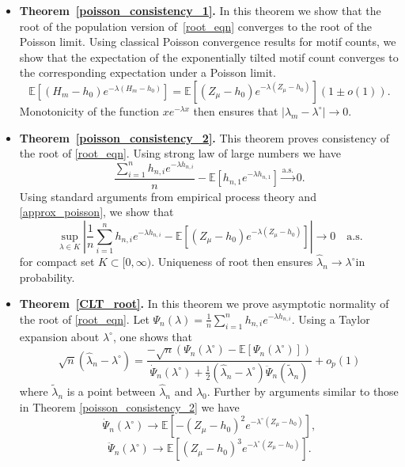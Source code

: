 \documentclass[12pt]{article}
\numberwithin{equation}{section}
\begin{document}
\begin{itemize}
    \item \textbf{Theorem~\ref{poisson_consistency_1}.} In this theorem we show that the root of the population version of~\eqref{root_eqn} converges to the root of the Poisson limit. Using classical Poisson convergence results for
    motif counts, we show that the expectation of the exponentially tilted motif count converges to
    the corresponding expectation under a Poisson limit. 
    \begin{equation}\mathbb{E}[(H_m-h_0)e^{-\lambda(H_m-h_0)}]=\mathbb{E}[(Z_{\mu}-h_0)e^{-\lambda(Z_{\mu}-h_0)}](1\pm o(1))\label{approx_poisson}.
\end{equation}
    Monotonicity of the function $xe^{-\lambda x}$ then ensures that $|\lambda_{m}-\lambda^{\circ}|\rightarrow 0$.\\
    
    \item \textbf{Theorem~\ref{poisson_consistency_2}.}
    This theorem proves consistency of the root of \eqref{root_eqn}. Using strong law of large numbers we have
    \[
\frac{\sum_{i=1}^n h_{n,i} e^{-\lambda h_{n,i}}}{n} - \mathbb{E}\left[h_{n,1} e^{-\lambda h_{n,1}}\right] \xrightarrow{\text{a.s.}} 0.
\]
Using standard arguments from empirical process theory and \eqref{approx_poisson}, we show that
\[
\sup_{\lambda \in K} \left\lvert\frac{1}{n} \sum_{i=1}^n h_{n,i} e^{-\lambda h_{n,i}} - \mathbb{E}\left[(Z_{\mu}-h_0)e^{-\lambda(Z_{\mu}-h_0)}\right]\right\rvert\to 0 \quad \text{a.s.}
\]
for compact set $K \subset [0, \infty)$. Uniqueness of root then ensures 
\(
 \hat{\lambda}_n \to \lambda^{\circ}\)in probability.\\
    
    \item \textbf{Theorem~\ref{CLT_root}.} In this theorem we prove asymptotic normality of the root of \eqref{root_eqn}. Let $\Psi_n(\lambda) = \frac{1}{n}\sum_{i=1}^n h_{n,i} e^{-\lambda h_{n,i}}$. Using a Taylor expansion about \(\lambda^{\circ}\), one shows that
\begin{equation}
\sqrt{n} (\hat{\lambda}_n - \lambda^{\circ}) = 
\frac{- \sqrt{n} (\Psi_n(\lambda^{\circ}) - \mathbb{E}[\Psi_n(\lambda^{\circ})])}{\dot{\Psi}_n(\lambda^{\circ}) + \frac{1}{2} (\hat{\lambda}_n - \lambda^{\circ}) \ddot{\Psi}_n(\tilde{\lambda}_n)} + o_p(1)
\label{Z_Taylor_short}
\end{equation}
where $\tilde{\lambda}_n$ is a point between $\hat{\lambda}_n$ and $\lambda_0$.
Further by arguments similar to those in Theorem \ref{poisson_consistency_2} we have
\[\dot{\Psi}_n(\lambda^{\circ}) \to \mathbb{E}\left[-(Z_{\mu}-h_0)^2e^{-\lambda^{\circ}(Z_{\mu}-h_0)}\right],\]
\[\ddot{\Psi}_n(\lambda^{\circ}) \to \mathbb{E}\left[(Z_{\mu}-h_0)^3e^{-\lambda^{\circ}(Z_{\mu}-h_0)}\right].\]


\end{itemize}
\end{document}
